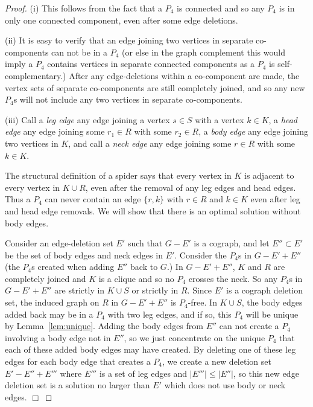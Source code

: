 \documentclass{llncs}
\begin{document}
\begin{proof}
 (i) This follows from the fact that a $P_4$ is connected and so any $P_4$ is in only one connected component, even after some edge deletions.

 (ii) It is easy to verify that an edge joining two vertices in separate co-components can not be in a $P_4$ (or else in the graph complement this would imply a $P_4$ contains vertices in separate connected components as a $P_4$ is self-complementary.) After any edge-deletions within a co-component are made, the vertex sets of separate co-components are still completely joined, and so any new $P_4$s will not include any two vertices in separate co-components.

 (iii) Call a \emph{leg edge} any edge joining a vertex $s \in S$ with a vertex $k \in K$, a \emph{head edge} any edge joining some $r_1 \in R$ with some $r_2 \in R$, a \emph{body edge} any edge joining two vertices in $K$, and call a \emph{neck edge} any edge joining some $r \in R$ with some $k \in K$.
  
 The structural definition of a spider says that every vertex in $K$ is adjacent to every vertex in $K \cup R$, even after the removal of any leg edges and head edges. Thus a $P_4$ can never contain an edge $\{r,k\}$ with $r\in R$ and $k\in K$ even after leg and head edge removals. We will show that there is an optimal solution without body edges.
  
 Consider an edge-deletion set $E'$ such that $G-E'$ is a cograph, and let $E'' \subset E'$ be the set of body edges and neck edges in $E'$. Consider the $P_4$s in $G - E' + E''$ (the $P_4$s created when adding $E''$ back to $G$.) In $G - E' + E''$, $K$ and $R$ are completely joined and $K$ is a clique and so no $P_4$ crosses the neck. So any $P_4$s in $G-E'+E''$ are strictly in $K\cup S$ or strictly in $R$. Since $E'$ is a cograph deletion set, the induced graph on $R$ in $G-E'+E''$ is $P_4$-free. In $K\cup S$, the body edges added back may be in a $P_4$ with two leg edges, and if so, this $P_4$ will be unique by Lemma~\ref{lem:unique}. Adding the body edges from $E''$ can not create a $P_4$ involving a body edge not in $E''$, so we just concentrate on the unique $P_4$ that each of these added body edges may have created. By deleting one of these leg edges for each body edge that creates a $P_4$, we create a new deletion set $E'-E''+ E'''$ where $E'''$ is a set of leg edges and $|E'''| \leq |E''|$, so this new edge deletion set is a solution no larger than $E'$ which does not use body or neck edges.
 \hfill $\Box$
\end{proof}
\end{document}
